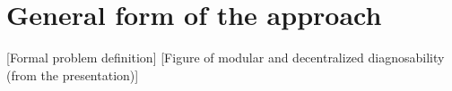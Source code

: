 \documentclass[a4paper, 10pt, conference]{ieeeconf}
\begin{document}
% 
% 


\section{General form of the approach}
\label{sec:General}

[Formal problem definition]
[Figure of modular and decentralized diagnosability (from the presentation)]
\end{document}
